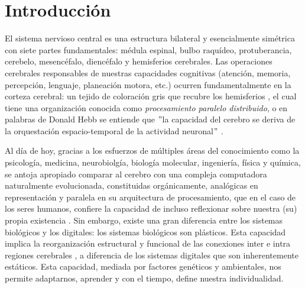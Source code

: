 \documentclass[11pt,letterpaper]{article}
\numberwithin{equation}{subsection}
\numberwithin{table}{subsection}
\begin{document}


\newpage
\tableofcontents
\vfill

\newpage
\renewcommand{\abstractname}{Decodificación neuronal mediante Redes Neuronales Profundas}



\section{Introducción }

\noindent El sistema nervioso central es una estructura bilateral y esencialmente simétrica con siete partes fundamentales: médula espinal, bulbo raquídeo, protuberancia, cerebelo, mesencéfalo, diencéfalo y hemisferios cerebrales. Las operaciones cerebrales responsables de nuestras capacidades cognitivas (atención, memoria, percepción, lenguaje, planeación motora, etc.) ocurren fundamentalmente en la corteza cerebral: un tejido de coloración gris que recubre los hemisferios \cite{Kandel2000}, el cual tiene una organización conocida como \textit{procesamiento paralelo distribuido}, o en palabras de Donald Hebb se entiende que $"$la capacidad del cerebro se deriva de la orquestación espacio-temporal de la actividad neuronal$"$ \cite{Hebb2005}. 

\bigskip
\noindent Al día de hoy, gracias a los esfuerzos de múltiples áreas del conocimiento como la psicología, medicina, neurobiolgía, biología molecular, ingeniería, física y química, se antoja apropiado comparar al cerebro con una compleja computadora naturalmente evolucionada, constituidas orgánicamente, analógicas en representación y paralela en su arquitectura de procesamiento, que en el caso de los seres humanos, confiere la capacidad de incluso reflexionar sobre nuestra (su) propia existencia \cite{Churchland1994}. Sin embargo, existe una gran diferencia entre los sistemas biológicos y los digitales: los sistemas biológicos son plásticos. Esta capacidad implica la reorganización estructural y funcional de las conexiones inter e intra regiones cerebrales \cite{costandi2016neuroplasticity}, a diferencia de los sistemas digitales que son inherentemente estáticos. Esta capacidad, mediada por factores genéticos y ambientales, nos permite adaptarnos, aprender y con el tiempo, define nuestra individualidad.
\end{document}
